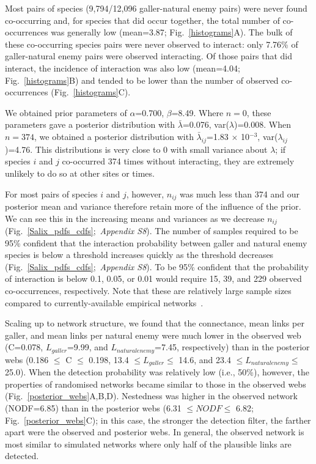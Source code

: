 \documentclass[12pt]{article}
\begin{document}
\begin{spacing}{2.0}
  Most pairs of species (9,794/12,096 galler-natural enemy pairs) were never found co-occurring and, for species that did occur together, the total number of co-occurrences was generally low (mean=3.87; Fig.~\ref{histograms}A). The bulk of these co-occurring species pairs were never observed to interact: only 7.76\% of galler-natural enemy pairs were observed interacting. Of those pairs that did interact, the incidence of interaction was also low (mean=4.04; Fig.~\ref{histograms}B) and tended to be lower than the number of observed co-occurrences (Fig.~\ref{histograms}C).


  We obtained prior parameters of $\alpha$=0.700, $\beta$=8.49. Where $n = 0$, these parameters gave a posterior distribution with $\bar\lambda$=0.076, var($\lambda$)=0.008. When $n = 374$, we obtained a posterior distribution with $\bar\lambda_{ij}$=1.83 $\times$ 10$^{-3}$, var($\lambda_{ij}$)=4.76. This distributions is very close to 0 with small variance about $\lambda$; if species $i$ and $j$ co-occurred 374 times without interacting, they   are extremely unlikely to do so at other sites or times. 


  For most pairs of species $i$ and $j$, however, $n_{ij}$ was much less than 374 and our posterior mean and variance therefore retain more of the influence of the prior. We can see this in the increasing means and variances as we decrease $n_{ij}$ (Fig.~\ref{Salix_pdfs_cdfs};~\emph{Appendix S8}). The number of samples required to be 95\% confident that the interaction probability between galler and natural enemy species is below a threshold increases quickly as the threshold decreases (Fig.~\ref{Salix_pdfs_cdfs};~\emph{Appendix S8}). To be 95\% confident that the probability of interaction is below 0.1, 0.05, or 0.01 would require 15, 39, and 229 observed co-occurrences, respectively. Note that these are relatively large sample sizes compared to currently-available empirical networks~\citep{Morris2014}.


  Scaling up to network structure, we found that the connectance, mean links per galler, and mean links per natural enemy were much lower in the observed web (C=0.078, $L_{galler}$=9.99, and $L_{natural enemy}$=7.45, respectively) than in the posterior webs (0.186 $\leq$ C $\leq$ 0.198, 13.4 $\leq L_{galler} \leq$ 14.6, and 23.4 $\leq L_{natural enemy} \leq$ 25.0). When the detection probability was relatively low (i.e., 50\%), however, the properties of randomised networks became similar to those in the observed webs (Fig.~\ref{posterior_webs}A,B,D). Nestedness was higher in the observed network (NODF=6.85) than in the posterior webs (6.31 $\leq NODF \leq$ 6.82; Fig.~\ref{posterior_webs}C); in this case, the stronger the detection filter, the farther apart were the observed and posterior webs. In general, the observed network is most similar to simulated networks where only half of the plausible links are detected. 



\end{spacing}
\end{document}
